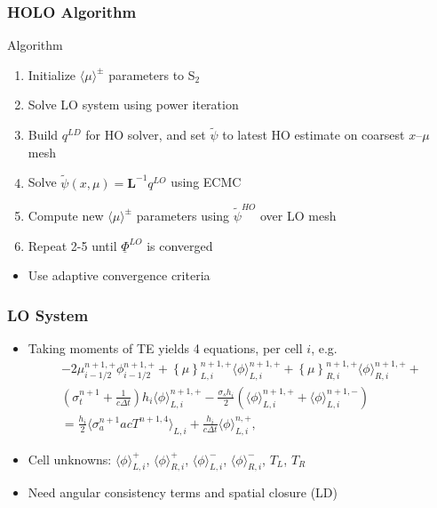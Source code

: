 \documentclass[xcolor=dvipsnames,hyperref={pdfpagelabels=false},unknownkeysallowed]{beamer}
\newcommand{\colb}[1]{{\color{blue} #1}}
\newlength{\wideitemsep}
\let\olditem\item
\renewcommand{\item}{\setlength{\itemsep}{\wideitemsep}\olditem}
\newcommand{\B}[1]{\ensuremath{\mathbf{#1}}}
\newcommand{\mom}[1]{\langle #1 \rangle}
\newcommand{\cur}[1]{\left\{ #1 \right\}}
\begin{document}
\begin{frame}
    \frametitle{HOLO Algorithm}
    {
    \begin{block}{Algorithm}
        \begin{enumerate}
            \item Initialize $\mom{\mu}^{\pm}$ parameters to S$_2$
            \item Solve LO system using power iteration
            \item Build $q^{LD}$ for HO solver, and set $\tilde{\psi}$ to latest
                HO estimate
                on coarsest $x$--$\mu$ mesh
            \item Solve $\tilde \psi(x,\mu) = \B L^{-1}q^{LO}$ using ECMC
            \item Compute new $\mom{\mu}^\pm$ parameters using $\tilde \psi^{HO}$ over LO mesh
            \item Repeat 2-5 until $\underline \Phi^{LO}$ is converged
        \end{enumerate}

    \begin{itemize}
        \item Use adaptive convergence criteria
    \end{itemize}
    \end{block}
}
\end{frame}

\begin{frame}
    \frametitle{LO System}
    \begin{itemize}
        \item Taking moments of TE yields \colb{4 equations}, per cell $i$, e.g.
\begin{multline}\label{lo_tran}
    -2{\mu}_{i-1/2}^{n+1,+} \phi_{i-1/2}^{n+1,+} + \cur {\mu}_{L,i}^{n+1,+}
  \mom{\phi}_{L,i}^{n+1,+}
  +  \cur\mu_{R,i}^{n+1,+}
  \mom{\phi}_{R,i}^{n+1,+} +  \\ \left(\sigma_t^{n+1}+\frac{1}{c \Delta t} \right) h_i 
  \mom{\phi}_{L,i}^{n+1,+} -  \frac{\sigma_s h_i}{2} \left( \mom{\phi}_{L,i}^{n+1,+} +
  \mom\phi_{L,i}^{n+1,-}\right) \\ = \frac{h_i}{2} \mom{\sigma_a^{n+1} a c T^{n+1,4}}_{L,i} +
  \frac{h_i}{c\Delta t}\mom{\phi}_{L,i}^{n,+},
\end{multline}
        \item Cell unknowns: $\mom{\phi}_{L,i}^{+}$, $\mom{\phi}_{R,i}^{+}$,
        $\mom{\phi}_{L,i}^{-}$, $\mom{\phi}_{R,i}^{-}$, $T_L$, $T_R$

    \item Need \colb{angular} consistency terms  and spatial closure
        (LD)
    \end{itemize}

\end{frame}
\end{document}
